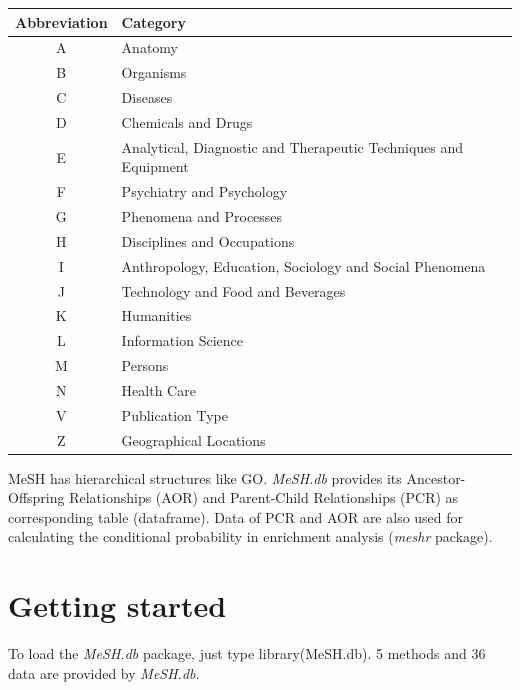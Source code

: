 \documentclass[11pt]{article}
\newcommand{\Rpackage}[1]{{\textit{#1}}}
\begin{document}
\begin{center}
  \begin{table}[htbp]
    \begin{tabular}{|c|l|}\hline
      Abbreviation & Category \\ \hline \hline
      A & Anatomy \\ \hline
      B & Organisms \\ \hline
      C & Diseases \\ \hline
      D & Chemicals and Drugs \\ \hline
      E & Analytical, Diagnostic and Therapeutic Techniques and Equipment \\ \hline
      F & Psychiatry and Psychology \\ \hline
      G & Phenomena and Processes \\ \hline
      H & Disciplines and Occupations \\ \hline
      I & Anthropology, Education, Sociology and Social Phenomena \\ \hline
      J & Technology and Food and Beverages \\ \hline
      K & Humanities \\ \hline
      L & Information Science \\ \hline
      M & Persons \\ \hline
      N & Health Care \\ \hline
      V & Publication Type \\ \hline
      Z & Geographical Locations \\ \hline
\end{tabular}
  \end{table}
\end{center}

\newpage
MeSH has hierarchical structures like GO. \Rpackage{MeSH.db} provides its Ancestor-Offspring Relationships (AOR) and Parent-Child Relationships (PCR) as corresponding table (dataframe). Data of PCR and AOR are also used for calculating the conditional probability in enrichment analysis (\Rpackage{meshr} package).
\newpage
\section{Getting started}
To load the \Rpackage{MeSH.db} package, just type library(MeSH.db). 5 methods and 36 data are provided by \Rpackage{MeSH.db}.
\end{document}
